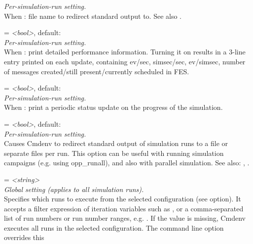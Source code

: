 \begin{description}
    \textit{Per-simulation-run setting.}\\
    When
    :
    file name to redirect standard output to. See also
    .
\item[cmdenv-performance-display] = \textit{<bool>}, default: \\
    \textit{Per-simulation-run setting.}\\
    When :
    print detailed performance information. Turning it on results in a 3-line
    entry printed on each update, containing ev/sec, simsec/sec, ev/simsec,
    number of messages created/still present/currently scheduled in FES.
\item[cmdenv-progress-updates] = \textit{<bool>}, default: \\
    \textit{Per-simulation-run setting.}\\
    When :
    print a periodic status update on the progress of the simulation.
\item[cmdenv-redirect-output] = \textit{<bool>}, default: \\
    \textit{Per-simulation-run setting.}\\
    Causes Cmdenv to redirect standard output of simulation runs to a file or
    separate files per run. This option can be useful with running simulation
    campaigns (e.g. using opp\_runall), and also with parallel simulation. See
    also: ,
    .
\item[cmdenv-runs-to-execute] = \textit{<string>}\\
    \textit{Global setting (applies to all simulation runs).}\\
    Specifies which runs to execute from the selected configuration (see
     option). It accepts a
    filter expression of iteration variables such as , or
    a comma-separated list of run numbers or run number ranges, e.g.
    . If
    the value is missing, Cmdenv executes all runs in the selected
    configuration. The  command line option overrides this

\end{description}
